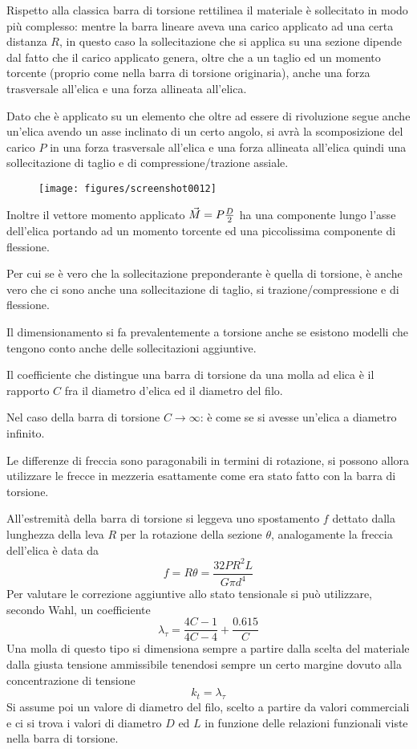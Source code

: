 \documentclass[a4paper, 15pt]{article}
\begin{document}
\begin{adjustwidth}{2in}{}
Rispetto alla classica barra di torsione rettilinea il materiale è sollecitato in modo più complesso: mentre la barra lineare aveva una carico applicato ad una certa distanza $R$, in questo caso la sollecitazione che si applica su una sezione dipende dal fatto che il carico applicato genera, oltre che a un taglio ed un momento torcente (proprio come nella barra di torsione originaria), anche una forza trasversale all'elica e una forza allineata all'elica. 

Dato che è applicato su un elemento che oltre ad essere di rivoluzione segue anche un'elica avendo un asse inclinato di un certo angolo, si avrà la scomposizione del carico $P$ in una forza trasversale all'elica e una forza allineata all'elica quindi una sollecitazione di taglio e di compressione/trazione assiale. 
\begin{figure}[H]
	\centering
	\texttt{[image: figures/screenshot0012]}
	\label{fig:screenshot0012}
\end{figure}
Inoltre il vettore momento applicato $\vec{M} = P{D\over2}$ ha una componente  lungo l'asse dell'elica portando ad un momento torcente ed una piccolissima componente di flessione. 

Per cui se è vero che la sollecitazione preponderante è quella di torsione, è anche vero che ci sono anche una sollecitazione di taglio, si trazione/compressione e di flessione. \newline 

Il dimensionamento si fa prevalentemente a torsione anche se esistono modelli che tengono conto anche delle sollecitazioni aggiuntive. 

Il coefficiente che distingue una barra di torsione da una molla ad elica è il rapporto $C$ fra il diametro d'elica ed il diametro del filo. 

Nel caso della barra di torsione $C\rightarrow\infty$: è come se si avesse un'elica a diametro infinito. 

Le differenze di freccia sono paragonabili in termini di rotazione, si possono allora utilizzare le frecce in mezzeria esattamente come era stato fatto con la barra di torsione.

All'estremità della barra di torsione si leggeva uno spostamento $f$ dettato dalla lunghezza della leva $R$ per la rotazione della sezione $\theta$, analogamente la freccia dell'elica è data da 
\[f=R\theta = \dfrac{32PR^2L}{G\pi d^4}\]
Per valutare le correzione aggiuntive allo stato tensionale si può utilizzare, secondo Wahl, un coefficiente 
\[\lambda_\tau = \dfrac{4C-1}{4C-4} + \dfrac{0.615}{C}\]
Una molla di questo tipo si dimensiona sempre a partire dalla scelta del materiale dalla giusta tensione ammissibile tenendosi sempre un certo margine dovuto alla concentrazione di tensione 
\[k_t = \lambda_\tau\]
Si assume poi un valore di diametro del filo, scelto a partire da valori commerciali e ci si trova i valori di diametro $D$ ed $L$ in funzione delle relazioni funzionali  viste nella barra di torsione. 


\end{adjustwidth}
\end{document}
